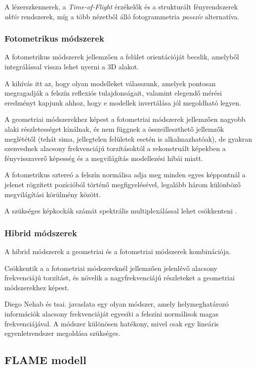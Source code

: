 \documentclass[12pt,a4]{article}
\begin{document}
	
	A lézerszkennerek, a \textit{Time-of-Flight} érzékelők és a strukturált fényrendszerek \textit{aktív} rendszerek, míg a több nézetből álló fotogrammetria \textit{passzív} alternatíva.
	
	\subsubsection{Fotometrikus módszerek}
	A fotometrikus módszerek \cite{3dmm} jellemzően a felület orientációját becslik, amelyből integrálással vissza lehet nyerni a 3D alakot.
	
	 A kihívás itt az, hogy olyan modelleket válasszunk, amelyek pontosan megragadják a felszín reflexiós tulajdonságait, valamint elegendő mérési eredményt kapjunk ahhoz, hogy e modellek invertálása jól megoldható legyen. 
	 
	 A geometriai módszerekhez képest a fotometriai módszerek
	 jellemzően nagyobb alaki részletességet kínálnak, és nem függnek a
	 összeilleszthető jellemzők meglététől
	(tehát sima, jellegtelen felületek esetén is alkalmazhatóak), de gyakran szenvednek alacsony frekvenciájú torzításoktól a rekonstruált képekben
	a fényvisszaverő képesség és a megvilágítás modellezési hibái miatt.
	
	
	A fotometrikus sztereó \cite{photometric} a felszín normálisa adja meg minden egyes képpontnál a jelenet rögzített pozícióból történő megfigyelésével, legalább három különböző megvilágítási körülmény között.
	
	 A szükséges képkockák számát spektrális multiplexálással lehet csökkenteni \cite{multiplex}.
	
	\subsubsection{Hibrid módszerek}
	A hibrid módszerek \cite{3dmm} a
	geometriai és a fotometriai módszerek kombinációja. 
	
	Csökkentik a
	a fotometriai módszereknél jellemzően jelenlévő alacsony frekvenciájú torzítást, és
	növelik a nagyfrekvenciájú részleteket a geometriai módszerekhez képest. 
	
	Diego Nehab és tsai. \cite{hibrid} javaslata egy olyan módszer, amely helymeghatározó információk alacsony frekvenciáját egyesíti a felszíni normálisok magas frekvenciájával. 
	A módszer különösen hatékony, mivel csak egy lineáris egyenletrendszer megoldása szükséges. 

    \subsection{FLAME modell}
\end{document}
